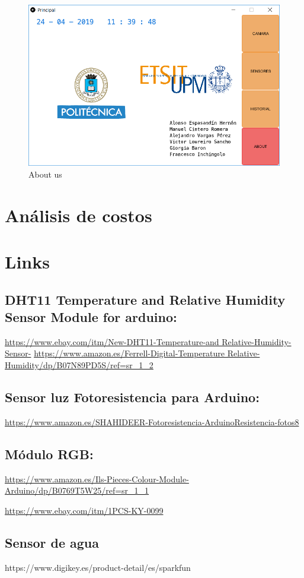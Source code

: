 \documentclass[12pt]{article}
\begin{document}
\begin{figure}[H]
	\centering
	\includegraphics[scale=.6]{about}
	\caption{About us}
	\label{fig:about}
\end{figure}

\newpage

\section{Análisis de costos}


\newpage

\section{Links}

\subsection{DHT11 Temperature and Relative Humidity Sensor Module for arduino:}

\url{https://www.ebay.com/itm/New-DHT11-Temperature-and Relative-Humidity-Sensor-}
\newline
\url{https://www.amazon.es/Ferrell-Digital-Temperature Relative-Humidity/dp/B07N89PD5S/ref=sr_1_2}

\subsection{Sensor luz Fotoresistencia para Arduino:}
\url{https://www.amazon.es/SHAHIDEER-Fotoresistencia-ArduinoResistencia-fotos8}

\subsection{Módulo RGB:}
\url{https://www.amazon.es/Ils-Pieces-Colour-Module-Arduino/dp/B0769T5W25/ref=sr_1_1}

\url{https://www.ebay.com/itm/1PCS-KY-0099}

\subsection{Sensor de agua}
{https://www.digikey.es/product-detail/es/sparkfun}


\newpage

\listoffigures
\end{document}
